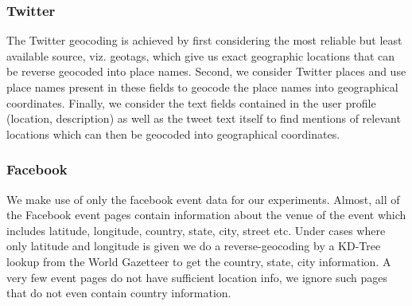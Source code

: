 \iffalse Most news articles and blog posts mention multiple locations, e.g.,
the location of reporting, the location of the incident, and locations corresponding
to the hometown of the newspaper. We developed a probabilistic reasoning
engine using probabilistic soft logic (PSL)
to infer the most likely city, state and country which is the main geographic focus the article.The PSL geocoder combines various types of evidence, such as named entities
such as locations, persons, and organizations identified by RLP, as
well as common names and aliases and populations of known
locations. These diverse types of evidence are used in weighted rules
that prioritize their influence on the PSL model's location
prediction. For example, extracted location tokens are strong
indicators of the content location of an article, while organization
and person names containing location names are weaker but still
informative signals; the rules corresponding to these evidence types
are weighted accordingly.

The methodology is similar to {\em Web-a-where: Geo-Tagging Web Content}.
\fi 

\subsubsection{Twitter}
The Twitter\cite{twitter} geocoding is achieved by first
considering the most reliable but least available source,
viz. geotags, which give us exact geographic locations that can be
reverse geocoded into place names.  Second, we consider Twitter places
and use place names present in these fields to geocode the place names
into geographical coordinates.  Finally, we consider the text fields
contained in the user profile (location, description) as well as the
tweet text itself to find mentions of relevant locations which can
then be geocoded into geographical coordinates.

\subsubsection{Facebook}
We make use of only the facebook event data for our experiments. Almost, all of the Facebook event pages contain information about the venue of the event which includes latitude, longitude, country, state, city, street etc. Under cases where only latitude and longitude is given we do a reverse-geocoding by a KD-Tree lookup\cite{kd-tree} from the World Gazetteer to get the country, state, city information. A very few event pages do not have sufficient location info, we ignore such pages that do not even contain country information.
